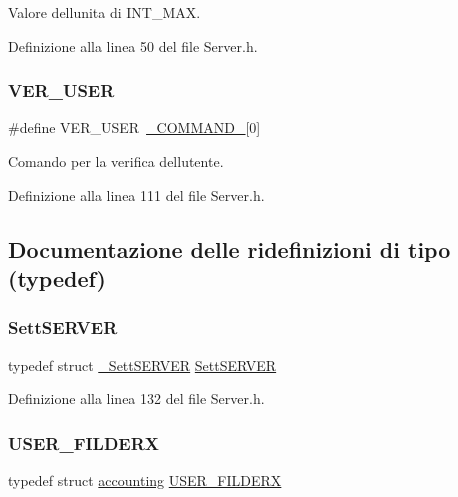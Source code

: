 Valore dell\textquotesingle{}unita\textquotesingle{} di I\+N\+T\+\_\+\+M\+AX. 



Definizione alla linea 50 del file Server.\+h.

\mbox{\label{a00050_a93aba1d96ea1be9898253d4fa67e185e}} 
\subsubsection{\texorpdfstring{VER\_USER}{VER\_USER}}
{\footnotesize\ttfamily \#define V\+E\+R\+\_\+\+U\+S\+ER~\mbox{\hyperlink{a00050_ad7ed85b86ff98d7a5853304284acd79e}{\+\_\+\+C\+O\+M\+M\+A\+N\+D\+\_\+}}\mbox{[}0\mbox{]}}



Comando per la verifica dell\textquotesingle{}utente. 



Definizione alla linea 111 del file Server.\+h.



\subsection{Documentazione delle ridefinizioni di tipo (typedef)}
\mbox{\label{a00050_a2ae1b7622ac02fc56c93b1f3911fbd76}} 
\subsubsection{\texorpdfstring{SettSERVER}{SettSERVER}}
{\footnotesize\ttfamily typedef struct \mbox{\hyperlink{a00068}{\+\_\+\+Sett\+S\+E\+R\+V\+ER}} \mbox{\hyperlink{a00050_a2ae1b7622ac02fc56c93b1f3911fbd76}{Sett\+S\+E\+R\+V\+ER}}}



Definizione alla linea 132 del file Server.\+h.

\mbox{\label{a00050_a36ac654fad535999242c37c6b7534162}} 
\subsubsection{\texorpdfstring{USER\_FILDERX}{USER\_FILDERX}}
{\footnotesize\ttfamily typedef struct \mbox{\hyperlink{a00072}{accounting}} \mbox{\hyperlink{a00050_a36ac654fad535999242c37c6b7534162}{U\+S\+E\+R\+\_\+\+F\+I\+L\+D\+E\+RX}}}



